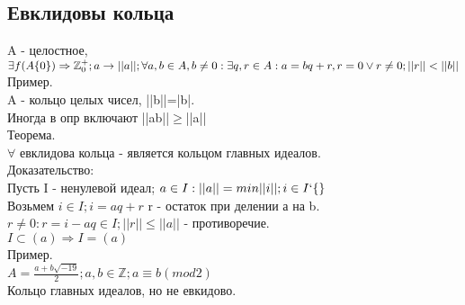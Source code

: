 \documentclass{article}
\begin{document}
\subsection{Евклидовы кольца}
A - целостное, $\exists f(A\lbrace 0 \rbrace )\Rightarrow \mathbb{Z}_0^+;\\
a \rightarrow ||a||; \forall a,b \in A, b\neq 0: \exists q,r \in A: a = bq + r, r =0 \vee r\neq 0; ||r||<||b||$\\
Пример.\\
A - кольцо целых чисел, ||b||=|b|.\\
Иногда в опр включают ||ab||$\geq$||a||\\
Теорема.\\
$\forall$ евклидова кольца - является кольцом главных идеалов.\\
Доказательство:\\
Пусть I - ненулевой идеал; $a \in I:\\
||a|| = min ||i||; i\in I`\lbrace \rbrace$\\
Возьмем $i \in I; i = aq+r$ r - остаток при делении а на b.\\ 
$r \neq 0: r = i-aq \in I; ||r||\leq ||a||$ - противоречие.\\
$I \subset (a) \Rightarrow I = (a)$\\
Пример.\\
$A = \frac{a+b\sqrt{-19}}{2}; a,b \in \mathbb{Z}; a \equiv b (mod 2)$\\
Кольцо главных идеалов, но не евкидово.\\
\end{document}
